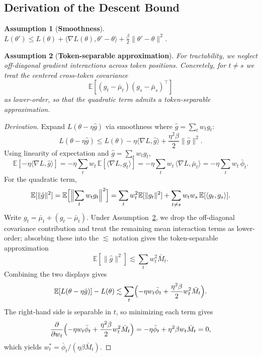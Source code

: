 \documentclass{article}
\newtheorem{assumption}{Assumption}
\newcommand{\EE}{\mathbb{E}}
\begin{document}
\subsection{Derivation of the Descent Bound}
\label{app:descent_bound}

\begin{assumption}[\textbf{Smoothness}]
\label{asm:smooth}
$L(\theta') \leq L(\theta) + \langle \nabla L(\theta), \theta'-\theta\rangle + \frac{\beta}{2}\|\theta'-\theta\|^2$.
\end{assumption}

\begin{assumption}[\textbf{Token-separable approximation}]
\label{asm:decorr}
For tractability, we neglect off-diagonal gradient interactions across token positions. Concretely, for $t \neq s$ we treat the centered cross-token covariance
$$
\EE[(g_t - \bar\mu_t)(g_s - \bar\mu_s)^\top]
$$
as lower-order, so that the quadratic term admits a token-separable approximation.
\end{assumption}

\begin{proof}[Derivation]
Expand $L(\theta - \eta\hat g)$ via smoothness where $\hat g = \sum_t w_t g_t$:
\begin{equation}
    L(\theta - \eta\hat g) \leq L(\theta) - \eta\langle \nabla L, \hat g\rangle + \frac{\eta^2\beta}{2}\|\hat g\|^2.
\end{equation}
Using linearity of expectation and $\hat g = \sum_t w_t g_t$,
\begin{equation}
    \EE[-\eta\langle \nabla L, \hat g\rangle]
    = -\eta \sum_t w_t \, \EE[\langle \nabla L, g_t\rangle]
    = -\eta \sum_t w_t \, \langle \nabla L, \bar\mu_t\rangle
    = -\eta \sum_t w_t \, \bar\phi_t.
\end{equation}
For the quadratic term,
\begin{equation}
    \EE[\|\hat g\|^2]
    = \EE\Bigl[\Bigl\|\sum_t w_t g_t\Bigr\|^2\Bigr]
    = \sum_t w_t^2 \EE[\|g_t\|^2] + \sum_{t \neq s} w_t w_s \, \EE[\langle g_t, g_s\rangle].
\end{equation}
Write $g_t = \bar\mu_t + (g_t - \bar\mu_t)$. Under Assumption~\ref{asm:decorr}, we drop the off-diagonal covariance contribution and treat the remaining mean interaction terms as lower-order; absorbing these into the $\lesssim$ notation gives the token-separable approximation
\begin{equation}
    \EE[\|\hat g\|^2] \lesssim \sum_t w_t^2 \bar M_t.
\end{equation}
Combining the two displays gives
\begin{equation}
    \EE[L(\theta - \eta\hat g)] - L(\theta)
    \lesssim
    \sum_t \Bigl(-\eta w_t \bar\phi_t + \frac{\eta^2\beta}{2} w_t^2 \bar M_t\Bigr).
\end{equation}
The right-hand side is separable in $t$, so minimizing each term gives
\begin{equation}
    \frac{\partial}{\partial w_t}\Bigl(-\eta w_t \bar\phi_t + \frac{\eta^2\beta}{2} w_t^2 \bar M_t\Bigr)
    = -\eta \bar\phi_t + \eta^2\beta w_t \bar M_t = 0,
\end{equation}
which yields $w_t^* = \bar\phi_t/(\eta\beta\bar M_t)$.
\end{proof}
\end{document}

